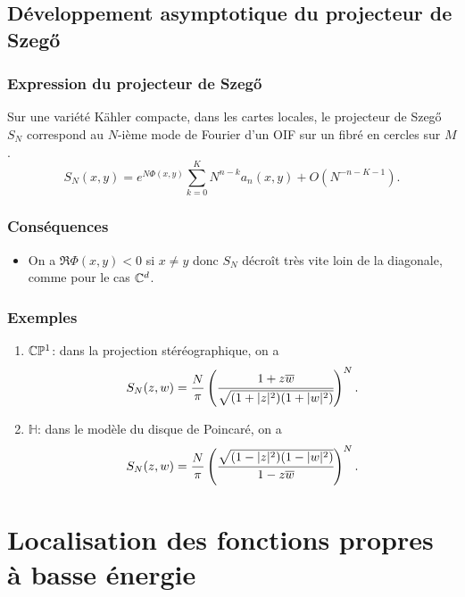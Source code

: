 \documentclass[mathserif]{beamer}
\begin{document}
\subsection{D\'eveloppement asymptotique du projecteur de Szeg\H{o}}
\begin{frame}
  \frametitle{Expression du projecteur de Szeg\H{o}}
  \begin{thm}
    Sur une vari\'et\'e K\"ahler compacte, dans les cartes locales, le
    projecteur de Szeg\H{o} $S_N$ correspond au $N$-ième mode de
    Fourier d'un OIF sur un fibré en cercles sur $M$.
    \[
      S_N(x,y)=e^{N\Phi(x,y)}\sum_{k=0}^KN^{n-k}a_n(x,y)+O(N^{-n-K-1}).
    \]
  \end{thm}
\end{frame}

\begin{frame}
  \frametitle{Cons\'equences}
\begin{itemize}
  \item 
  On a $\Re\Phi(x,y)<0$ si $x\neq y$ donc $S_N$ d\'ecroît très vite loin
  de la diagonale, comme pour le cas $\mathbb{C}^d$.
  \end{itemize}
  
\end{frame}

\begin{frame}
  \frametitle{Exemples}
  \begin{enumerate}
  \item $\mathbb{C}\mathbb{P}^1$: dans la projection st\'er\'eographique, on a
    \[
      S_N(z,w)=\frac{N}{\pi}\left(\cfrac{1+z\overline{w}}{\sqrt{(1+|z|^2)(1+|w|^2)}}\right)^N.
    \]
    
  \item $\mathbb{H}$: dans le modèle du disque de Poincar\'e, on
    a
    \[
      S_N(z,w)=\frac{N}{\pi}\left(\cfrac{\sqrt{(1-|z|^2)(1-|w|^2)}}{1-z\overline{w}}\right)^N.
    \]
    
  \end{enumerate}
\end{frame}

\section{Localisation des fonctions propres à basse \'energie}
\end{document}
